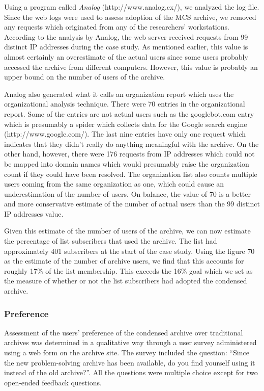 Using a program called {\it Analog} (http://www.analog.cx/), we analyzed the
log file. Since the web logs were used to assess adoption of the MCS archive,
we removed any requests which originated from any of the researchers'
workstations. According to the analysis by Analog, the web server received
requests from 99 distinct IP addresses during the case study. As mentioned
earlier, this value is almost certainly an overestimate of the actual users
since some users probably accessed the archive from different computers.
However, this value is probably an upper bound on the number of users of the
archive.

Analog also generated what it calls an organization report which uses the
organizational analysis technique. There were 70 entries in the organizational
report. Some of the entries are not actual users such as the googlebot.com
entry which is presumably a spider which collects data for the Google search
engine (http://www.google.com/). The last nine entries have only one request
which indicates that they didn't really do anything meaningful with the
archive. On the other hand, however, there were 176 requests from IP addresses
which could not be mapped into domain names which would presumably raise the
organization count if they could have been resolved. The organization list also
counts multiple users coming from the same organization as one, which could
cause an underestimation of the number of users. On balance, the value of 70 is
a better and more conservative estimate of the number of actual users than the
99 distinct IP addresses value.

Given this estimate of the number of users of the archive, we can now estimate
the percentage of list subscribers that used the archive. The list had
approximately 401 subscribers at the start of the case study. Using the figure
70 as the estimate of the number of archive users, we find that this accounts
for roughly 17\% of the list membership. This exceeds the 16\% goal which we
set as the measure of whether or not the list subscribers had adopted the
condensed archive.

\subsubsection{Preference}
Assessment of the users' preference of the condensed archive over traditional
archives was determined in a qualitative way through a user survey administered
using a web form on the archive site. The survey included the question: ``Since
the new problem-solving archive has been available, do you find yourself using
it instead of the old archive?''. All the questions were multiple choice except
for two open-ended feedback questions.

